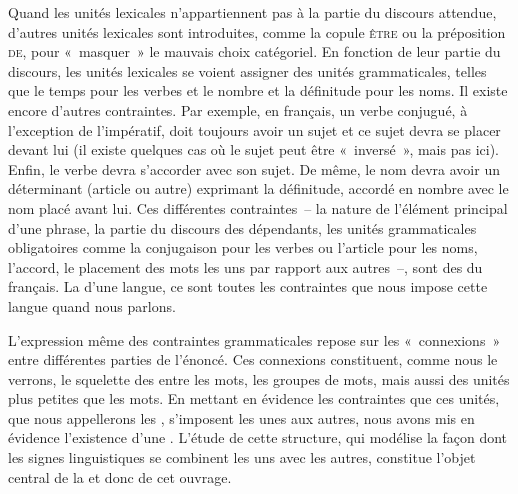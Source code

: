 Quand les unités lexicales n’appartiennent pas à la partie du discours attendue, d’autres unités lexicales sont introduites, comme la copule \textsc{être} ou la préposition \textsc{de}, pour «~masquer~» le mauvais choix catégoriel. En fonction de leur partie du discours, les unités lexicales se voient assigner des unités grammaticales, telles que le temps pour les verbes et le nombre et la définitude pour les noms. Il existe encore d’autres contraintes. Par exemple, en français, un verbe conjugué, à l’exception de l’impératif, doit toujours avoir un sujet et ce sujet devra se placer devant lui (il existe quelques cas où le sujet peut être «~inversé~», mais pas ici). Enfin, le verbe devra s’accorder avec son sujet. De même, le nom devra avoir un déterminant (article ou autre) exprimant la définitude, accordé en nombre avec le nom placé avant lui. Ces différentes contraintes~– la nature de l’élément principal d’une phrase, la partie du discours des dépendants, les unités grammaticales obligatoires comme la conjugaison pour les verbes ou l’article pour les noms, l’accord, le placement des mots les uns par rapport aux autres~–, sont des  du français. La  d’une langue, ce sont toutes les contraintes que nous impose cette langue quand nous parlons.

\begin{sloppypar}
L’expression même des contraintes grammaticales repose sur les «~connexions~» entre différentes parties de l’énoncé. Ces connexions constituent, comme nous le verrons, le squelette des  entre les mots, les groupes de mots, mais aussi des unités plus petites que les mots. En mettant en évidence les contraintes que ces unités, que nous appellerons les , s’imposent les unes aux autres, nous avons mis en évidence l’existence d’une . L’étude de cette structure, qui modélise la façon dont les signes linguistiques se combinent les uns avec les autres, constitue l’objet central de la  et donc de cet ouvrage.
\end{sloppypar}

